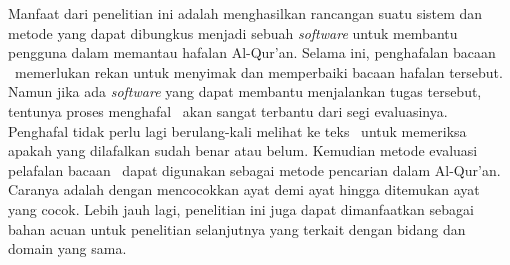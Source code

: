 Manfaat dari penelitian ini adalah menghasilkan rancangan suatu sistem dan metode yang dapat dibungkus menjadi sebuah \textit{software} untuk membantu pengguna dalam memantau hafalan Al-Qur'an. Selama ini, penghafalan bacaan \quran~memerlukan rekan untuk menyimak dan memperbaiki bacaan hafalan tersebut. Namun jika ada \textit{software} yang dapat membantu menjalankan tugas tersebut, tentunya proses menghafal \quran~akan sangat terbantu dari segi evaluasinya. Penghafal tidak perlu lagi berulang-kali melihat ke teks \quran~untuk memeriksa apakah yang dilafalkan sudah benar atau belum. Kemudian metode evaluasi pelafalan bacaan \quran~dapat digunakan sebagai metode pencarian dalam Al-Qur'an. Caranya adalah dengan mencocokkan ayat demi ayat hingga ditemukan ayat yang cocok. Lebih jauh lagi, penelitian ini juga dapat dimanfaatkan sebagai bahan acuan untuk penelitian selanjutnya yang terkait dengan bidang dan domain yang sama.


